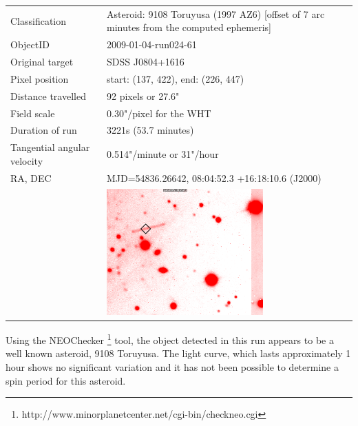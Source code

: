 \begin{tabular}{l l}
  Classification & Asteroid: 9108 Toruyusa (1997 AZ6) [offset of 7 arc minutes from the computed ephemeris]\\
  ObjectID & 2009-01-04-run024-61 \\
  Original target & SDSS J0804+1616 \\
  Pixel position & start: (137, 422), end: (226, 447) \\
  Distance travelled & 92 pixels or 27.6" \\
  Field scale & 0.30"/pixel for the WHT \\
  Duration of run & 3221s (53.7 minutes) \\
  Tangential angular velocity & 0.514"/minute or 31"/hour\\ 
  RA, DEC & MJD=54836.26642, 08:04:52.3 +16:18:10.6 (J2000) \\
       & \includegraphics[width=60mm]{images/2009-01-04-run024-61.png} \\
  \end{tabular}

  Using the NEOChecker \footnote{http://www.minorplanetcenter.net/cgi-bin/checkneo.cgi} tool, the object detected in this run appears to be a well known asteroid, 9108 Toruyusa. The light curve, which lasts approximately 1 hour shows no significant variation and it has not been possible to determine a spin period for this asteroid.  

  

